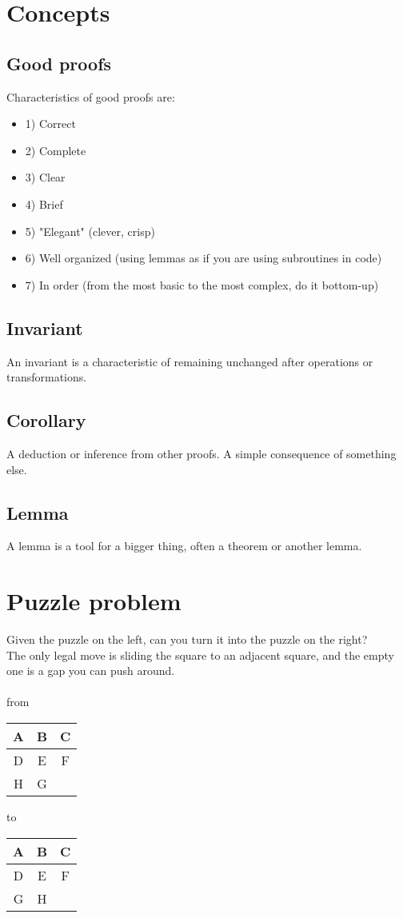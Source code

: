 \documentclass{article}
\begin{document}
	\section{Concepts}
	\subsection{Good proofs}
	Characteristics of good proofs are:
	\begin{itemize}
		\item 1) Correct
		\item 2) Complete
		\item 3) Clear
		\item 4) Brief
		\item 5) "Elegant" (clever, crisp)
		\item 6) Well organized (using lemmas as if you are using subroutines in code)
		\item 7) In order (from the most basic to the most complex, do it bottom-up)
	\end{itemize}
	\subsection{Invariant}
	An invariant is a characteristic of remaining unchanged after operations or transformations.
	\subsection{Corollary}
	A deduction or inference from other proofs. A simple consequence of something else.
	\subsection{Lemma}
	A lemma is a tool for a bigger thing, often a theorem or another lemma.
	
	\section{Puzzle problem}
	Given the puzzle on the left, can you turn it into the puzzle on the right? \\
	The only legal move is sliding the square to an adjacent square, and the empty one is a gap you can push around.\\\\
	from
	\begin{tabular}{ |c|c|c| } 
		\hline
		A & B & C \\
		\hline
		D & E & F \\ 
		\hline
		H & G & \\ 
		\hline
	\end{tabular}
	to
	\begin{tabular}{ |c|c|c| } 
		\hline
		A & B & C \\
		\hline
		D & E & F \\ 
		\hline
		G & H & \\ 
		\hline
	\end{tabular}
	
\end{document}
